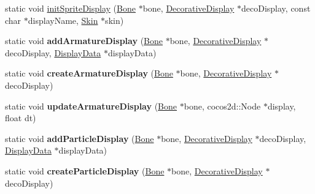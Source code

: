 \begin{DoxyCompactItemize}
\item 
static void \hyperlink{classcocostudio_1_1DisplayFactory_a6dfe16535e3d027a1fe1c39cf3f860a9}{init\+Sprite\+Display} (\hyperlink{classcocostudio_1_1Bone}{Bone} $\ast$bone, \hyperlink{classcocostudio_1_1DecorativeDisplay}{Decorative\+Display} $\ast$deco\+Display, const char $\ast$display\+Name, \hyperlink{classcocostudio_1_1Skin}{Skin} $\ast$skin)
\item 
\mbox{\label{classcocostudio_1_1DisplayFactory_afa1ce1d80f23990d667ffc900ecfab8d}} 
static void {\bfseries add\+Armature\+Display} (\hyperlink{classcocostudio_1_1Bone}{Bone} $\ast$bone, \hyperlink{classcocostudio_1_1DecorativeDisplay}{Decorative\+Display} $\ast$deco\+Display, \hyperlink{classcocostudio_1_1DisplayData}{Display\+Data} $\ast$display\+Data)
\item 
\mbox{\label{classcocostudio_1_1DisplayFactory_a8e0096b4b9532845486f7977f408fdd9}} 
static void {\bfseries create\+Armature\+Display} (\hyperlink{classcocostudio_1_1Bone}{Bone} $\ast$bone, \hyperlink{classcocostudio_1_1DecorativeDisplay}{Decorative\+Display} $\ast$deco\+Display)
\item 
\mbox{\label{classcocostudio_1_1DisplayFactory_a92dadd6c7037b9d32bb9d11598225b61}} 
static void {\bfseries update\+Armature\+Display} (\hyperlink{classcocostudio_1_1Bone}{Bone} $\ast$bone, cocos2d\+::\+Node $\ast$display, float dt)
\item 
\mbox{\label{classcocostudio_1_1DisplayFactory_a41e0c94cf1b8ca746a7fae8b0b7a953d}} 
static void {\bfseries add\+Particle\+Display} (\hyperlink{classcocostudio_1_1Bone}{Bone} $\ast$bone, \hyperlink{classcocostudio_1_1DecorativeDisplay}{Decorative\+Display} $\ast$deco\+Display, \hyperlink{classcocostudio_1_1DisplayData}{Display\+Data} $\ast$display\+Data)
\item 
\mbox{\label{classcocostudio_1_1DisplayFactory_a18e5acb084c5e8408b4488fe2082479a}} 
static void {\bfseries create\+Particle\+Display} (\hyperlink{classcocostudio_1_1Bone}{Bone} $\ast$bone, \hyperlink{classcocostudio_1_1DecorativeDisplay}{Decorative\+Display} $\ast$deco\+Display)
\item 
\mbox{\label{classcocostudio_1_1DisplayFactory_a672c8d2147b70790d2866e08a4123dec}} 

\end{DoxyCompactItemize}
